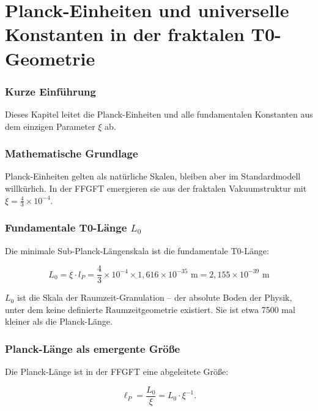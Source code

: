 \chapter{Planck-Einheiten und universelle Konstanten in der fraktalen T0-Geometrie}


	
	\subsection*{Kurze Einführung}
	
	Dieses Kapitel leitet die Planck-Einheiten und alle fundamentalen Konstanten aus dem einzigen Parameter \(\xi\) ab.
	
	\subsection*{Mathematische Grundlage}
	
	Planck-Einheiten gelten als natürliche Skalen, bleiben aber im Standardmodell willkürlich. In der FFGFT emergieren sie aus der fraktalen Vakuumstruktur mit \(\xi = \frac{4}{3} \times 10^{-4}\).
	
	\subsection*{Fundamentale T0-Länge \(L_0\)}
	
	Die minimale Sub-Planck-Längenskala ist die fundamentale T0-Länge:
	
	\begin{equation}
		\boxed{L_0 = \xi \cdot l_P = \frac{4}{3} \times 10^{-4} \times 1{,}616 \times 10^{-35} \text{ m} = 2{,}155 \times 10^{-39} \text{ m}}
	\end{equation}
	
	\(L_0\) ist die Skala der Raumzeit-Granulation -- der absolute Boden der Physik, unter dem keine definierte Raumzeitgeometrie existiert. Sie ist etwa 7500 mal kleiner als die Planck-Länge.
	
	\subsection*{Planck-Länge als emergente Größe}
	
	Die Planck-Länge ist in der FFGFT eine abgeleitete Größe:
	
	\begin{equation}
		\ell_P = \frac{L_0}{\xi} = L_0 \cdot \xi^{-1}.
	\end{equation}
	
